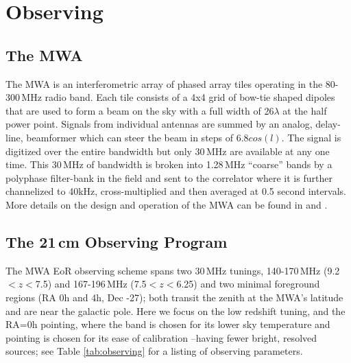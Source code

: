 \documentclass[preprint2]{aastex}
\begin{document}
\section{Observing}
\label{sec:observing}
\subsection{The MWA}
The MWA is an interferometric array of phased array tiles operating in the 80-300\,MHz radio band. Each tile consists of a 4x4 grid of bow-tie shaped dipoles that are used to form a beam on the sky with a full width of 26\arcdeg$\lambda$ at the half power point. Signals from individual antennas are summed by an analog, delay-line, beamformer which can steer the beam in steps of 6.8\arcdeg$cos(l)$.  The signal is digitized over the entire bandwidth but only 30\,MHz are available at any one time.  This 30\,MHz of bandwidth is broken into 1.28\,MHz ``coarse'' bands by a polyphase filter-bank in the field and sent to the correlator \citep{Ord:2015PASA...32....6O} where it is further channelized to 40kHz, cross-multiplied and then averaged at 0.5 second intervals.  More details on the design and operation of the MWA can be found in \cite{Lonsdale:2009p7913} and \cite{Tingay:2013p9022}.

\subsection{The 21\,cm Observing Program}
The MWA EoR observing scheme spans two 30\,MHz tunings, 140-170\,MHz (9.2$<z<$7.5) and 167-196\,MHz (7.5$<z<$6.25) and two minimal foreground regions (RA 0h and 4h, Dec -27\arcdeg); both transit the zenith at the MWA's  latitude and are near the galactic pole. Here we focus on the low redshift tuning, and the RA=0h pointing, where the band is chosen for its lower sky temperature and pointing is chosen for its ease of calibration --having fewer bright, resolved sources; see Table \ref{tab:observing} for a listing of observing parameters.
\end{document}
